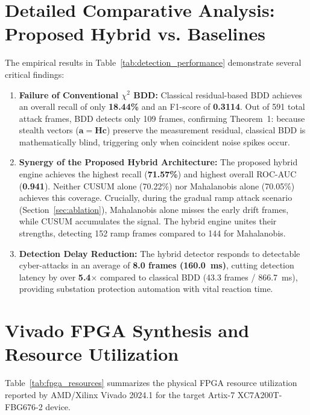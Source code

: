 \documentclass[12pt,a4paper]{report}
\begin{document}
\section{Detailed Comparative Analysis: Proposed Hybrid vs. Baselines}
The empirical results in Table~\ref{tab:detection_performance} demonstrate several critical findings:
\begin{enumerate}
    \item \textbf{Failure of Conventional $\chi^2$ BDD:} Classical residual-based BDD achieves
    an overall recall of only \textbf{18.44\%} and an F1-score of \textbf{0.3114}. Out of 591
    total attack frames, BDD detects only 109 frames, confirming Theorem~1: because stealth
    vectors ($\boldsymbol{a} = \boldsymbol{H}\boldsymbol{c}$) preserve the measurement residual,
    classical BDD is mathematically blind, triggering only when coincident noise spikes occur.
    \item \textbf{Synergy of the Proposed Hybrid Architecture:} The proposed hybrid engine
    achieves the highest recall (\textbf{71.57\%}) and highest overall ROC-AUC (\textbf{0.941}).
    Neither CUSUM alone (70.22\%) nor Mahalanobis alone (70.05\%) achieves this coverage.
    Crucially, during the gradual ramp attack scenario (Section~\ref{sec:ablation}), Mahalanobis
    alone misses the early drift frames, while CUSUM accumulates the signal. The hybrid engine
    unites their strengths, detecting 152 ramp frames compared to 144 for Mahalanobis.
    \item \textbf{Detection Delay Reduction:} The hybrid detector responds to detectable
    cyber-attacks in an average of \textbf{8.0 frames (160.0~ms)}, cutting detection latency
    by over \textbf{5.4$\times$} compared to classical BDD (43.3 frames / 866.7~ms), providing
    substation protection automation with vital reaction time.
\end{enumerate}

\section{Vivado FPGA Synthesis and Resource Utilization}
Table~\ref{tab:fpga_resources} summarizes the physical FPGA resource utilization reported
by AMD/Xilinx Vivado 2024.1 for the target Artix-7 XC7A200T-FBG676-2 device.
\end{document}
